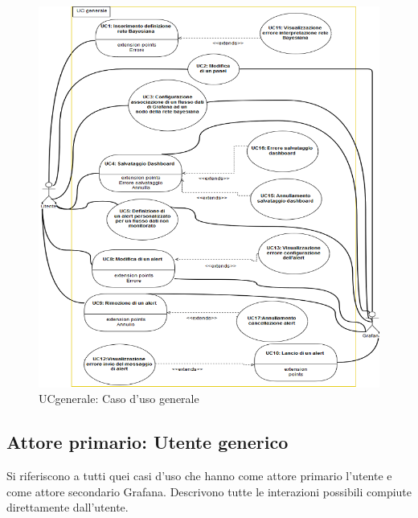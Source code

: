  
        \begin{figure}[!htbp]
                	\centering
                	\includegraphics[width=\textwidth]{UCgeneral.png}
                	\caption{UCgenerale: Caso d'uso generale}
                \end{figure}  
              \clearpage      
		\subsection{Attore primario: Utente generico}
		Si riferiscono a tutti quei casi d'uso che hanno come attore primario l'utente e come attore secondario Grafana. Descrivono tutte le interazioni possibili compiute direttamente dall'utente.
                    
                        
		
